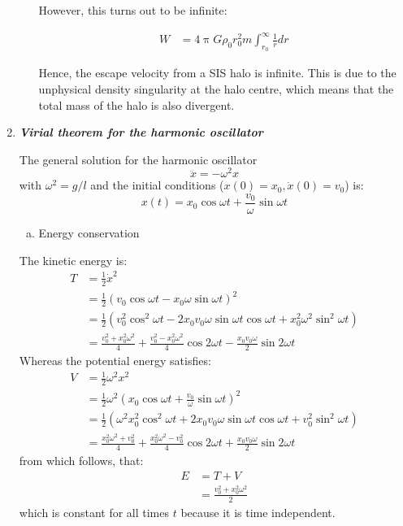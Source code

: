 \documentclass[a4paper,12pt]{article}
\newcommand{\question}[1]{\textbf{\textit{#1}}}
\renewcommand{\pi}{\uppi}
\begin{document}
\begin{enumerate}
\begin{enumerate}[(a)]
			However, this turns out to be infinite: 
			
			\begin{align*}
			W &= 4 \pi G \rho_0 r_0^2 m \int_{r_0}^{\infty} \frac{1}{r} dr
			\end{align*}
			
			Hence, the escape velocity from a SIS halo is infinite. This is due to the unphysical density singularity at the halo centre, which means that the total mass of the halo is also divergent. 
			
		\end{enumerate}
		
		\newpage
		
		\setcounter{equation}{0}
		\item \question{Virial theorem for the harmonic oscillator}
		
		The general solution for the harmonic oscillator
		\begin{equation}
		\ddot{x}=-\omega^2x
		\end{equation}
		with \(\omega^2=g/l\) and the initial conditions (\(x(0)=x_0, \dot{x}(0)=v_0\)) is:
		\begin{equation}
		x(t)=x_0\cos\omega t+\frac{v_0}{\omega}\sin\omega t
		\end{equation}
		
		\begin{enumerate}[(a)]
			\item Energy conservation
		\end{enumerate}
		
		The kinetic energy is:
		\begin{align}
		T&=\frac{1}{2}\dot{x}^2\\
		&=\frac{1}{2}\left(v_0\cos\omega t-x_0\omega\sin\omega t\right)^2\\
		&=\frac{1}{2}\left(v_0^2\cos^2\omega t-2x_0v_0\omega\sin\omega t\cos\omega t+x_0^2\omega^2\sin^2\omega t\right)\\
		&=\frac{v_0^2+x_0^2\omega^2}{4}+\frac{v_0^2-x_0^2\omega^2}{4}\cos 2\omega t-\frac{x_0v_0\omega}{2}\sin2\omega t
		\end{align}
		Whereas the potential energy satisfies:
		\begin{align}
		V&=\frac{1}{2}\omega^2x^2\\
		&=\frac{1}{2}\omega^2\left(x_0\cos\omega t+\frac{v_0}{\omega}\sin\omega t\right)^2\\
		&=\frac{1}{2}\left(\omega^2x_0^2\cos^2\omega t+2x_0v_0\omega\sin\omega t\cos\omega t+v_0^2\sin^2\omega t\right)\\
		&=\frac{x_0^2\omega^2+v_0^2}{4}+\frac{x_0^2\omega^2-v_0^2}{4}\cos 2\omega t+\frac{x_0v_0\omega}{2}\sin2\omega t
		\end{align}
		from which follows, that:
		\begin{align}
		E&=T+V\\
		&=\frac{v_0^2+x_0^2\omega^2}{2}
		\end{align}
		which is constant for all times \(t\) because it is time independent.
		

\end{enumerate}
\end{document}
